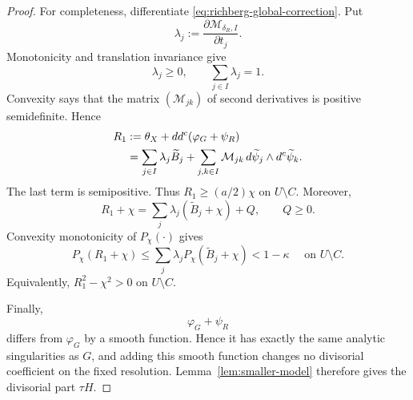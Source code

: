 \documentclass[reqno]{amsart}
\theoremstyle{remark}
\newcommand{\ddc}{dd^c}
\theoremstyle{plain}
\begin{document}
\begin{proof}
For completeness, differentiate
\eqref{eq:richberg-global-correction}.  Put
\[
 \lambda_j:=\frac{\partial\mathcal M_{\delta_R,I}}
                   {\partial t_j}.
\]
Monotonicity and translation invariance give
\[
 \lambda_j\geq0,\qquad\sum_{j\in I}\lambda_j=1.
\]
Convexity says that the matrix
$(\mathcal M_{jk})$ of second derivatives is
positive semidefinite.  Hence
\begin{align}
 R_1
 &:=
 \theta_X+\ddc(\varphi_G+\psi_R) \notag\\
 &=
 \sum_{j\in I}\lambda_j\widetilde B_j
 +
 \sum_{j,k\in I}\mathcal M_{jk}\,
 d\widetilde\psi_j\wedge d^c\widetilde\psi_k.
 \label{eq:richberg-formula}
\end{align}
The last term is semipositive.  Thus $R_1\geq(a/2)\chi$ on $U\setminus C$.  Moreover,
\[
 R_1+\chi
 =
 \sum_j\lambda_j(\widetilde B_j+\chi)+Q,
 \qquad Q\geq0.
\]
Convexity monotonicity of $P_\chi(\cdot)$ gives
\[
 P_\chi(R_1+\chi)
 \leq
 \sum_j\lambda_jP_\chi(\widetilde B_j+\chi)
 <1-\kappa \quad \text{ on }U \setminus C.
\]
Equivalently, $R_1^2-\chi^2>0$ on $U\setminus C$.

Finally,
\[
 \varphi_G+\psi_R
\]
differs from $\varphi_G$ by a smooth function.  Hence it has exactly
the same analytic singularities as $G$, and adding this smooth
function changes no divisorial coefficient on the fixed resolution.
Lemma~\ref{lem:smaller-model} therefore gives the divisorial part
$\tau H$. 
\end{proof}
\end{document}
